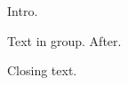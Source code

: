\documentclass{article}\usepackage{setspace,lscape,multicol}
\begin{document}
Intro.

{\doublespace Text in group.} After.

Closing text.
\end{document}
